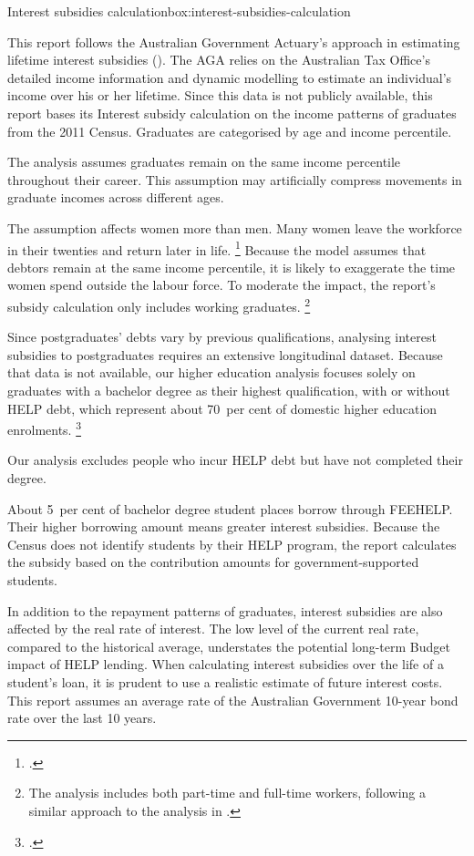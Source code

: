 \documentclass[embargoed]{grattan}
\begin{document}
\begin{bigbox*}{Interest subsidies calculation}{box:interest-subsidies-calculation}

This report follows the Australian Government Actuary's approach in estimating lifetime interest subsidies ().
The \gls{AGA} relies on the Australian Tax Office's detailed income information and dynamic modelling to estimate an individual's income over his or her lifetime. Since this data is not publicly available, this report bases its \gls{Interest subsidy} calculation on the income patterns of graduates from the 2011 Census.
Graduates are categorised by age and income percentile.

The analysis assumes graduates remain on the same income percentile throughout their career.
This assumption may artificially compress movements in graduate incomes across different ages.

The assumption affects women more than men.
Many women leave the workforce in their twenties and return later in life.%
\footcite[][Figure~9]{Norton2016HELPfuturefairer} Because the model assumes that debtors remain at the same income percentile, it is likely to exaggerate the time women spend outside the labour force.
To moderate the impact, the report's subsidy calculation only includes working graduates.%
\footnote{The analysis includes both part-time and full-time workers, following a similar approach to the analysis in \textcite[][7--8]{Chapman2014InquiryprovisionsHigher}.}

Since postgraduates’ debts vary by previous qualifications, analysing interest subsidies to postgraduates requires an extensive longitudinal dataset. Because that data is not available, our higher education analysis focuses solely on graduates with a bachelor degree as their highest qualification, with or without \gls{HELP} debt, which represent about 70~per cent of domestic higher education enrolments.%
\footnote{\textcite[][Table 2.6]{Education2016StudentsSelectedhigher}.} 

Our analysis excludes people who incur \gls{HELP} debt but have not completed their degree.

About 5~per cent of bachelor degree student places borrow through \gls{FEEHELP}\@.
Their higher borrowing amount means greater interest subsidies. Because the Census does not identify students by their \gls{HELP} program, the report calculates the subsidy based on the contribution amounts for government-supported students.

In addition to the repayment patterns of graduates, interest subsidies are also affected by the real rate of interest.
The low level of the current real rate, compared to the historical average, understates the potential long-term Budget impact of \gls{HELP} lending.
When calculating interest subsidies over the life of a student's loan, it is prudent to use a realistic estimate of future interest costs.
This report assumes an average rate of the Australian Government 10-year bond rate over the last 10 years.
\end{bigbox*}
\end{document}
